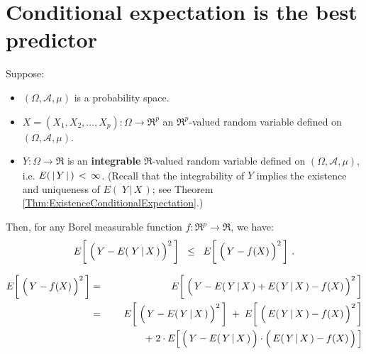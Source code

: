 

\section{Conditional expectation is the best predictor}
\setcounter{theorem}{0}
\setcounter{equation}{0}

\renewcommand{\theenumi}{\roman{enumi}}
\renewcommand{\labelenumi}{\textnormal{(\theenumi)}$\;\;$}


\begin{theorem}
\mbox{}
\vskip 0.2cm
\noindent
Suppose:
\begin{itemize}
\item
	$(\Omega,\mathcal{A},\mu)$ is a probability space.
\item
	$X = (X_{1}, X_{2}, \ldots, X_{p}) : \Omega \longrightarrow \Re^{p}$ an $\Re^{p}$-valued random variable
	defined on $(\Omega,\mathcal{A},\mu)$.
\item
	$Y : \Omega \longrightarrow \Re$ is an \textbf{\color{red}integrable} $\Re$-valued random variable
	defined on $(\Omega,\mathcal{A},\mu)$,
	i.e. $E(\,\vert\,\overset{{\color{white}.}}{Y}\,\vert\,)\,<\,\infty$.
	\vskip 0.01cm
	(Recall that the integrability of $Y$ implies the existence and uniqueness of $E\!\left(\;Y\,\vert\,X\,\right)$;
	see Theorem \ref{Thm:ExistenceConditionalExpectation}.)
\end{itemize}
Then, for any Borel measurable function $f : \Re^{p} \longrightarrow \Re$, we have:
\begin{equation*}
E\!\left[\;\left(\,Y \overset{{\color{white}.}}{-} E(\;Y\,\vert\,X\,)\,\right)^{2}\,\right]
\;\; \leq \;\;
E\!\left[\;\left(\,Y \overset{{\color{white}.}}{-} f(X)\,\right)^{2}\,\right]\,.
\end{equation*}
\end{theorem}
\proof
\begin{eqnarray*}
E\!\left[\;\left(\,Y \overset{{\color{white}.}}{-} f(X)\,\right)^{2}\,\right]
&=&
	E\!\left[\;\left(\,Y \overset{{\color{white}.}}{-} E(\,Y\,\vert\,X\,) + E(\,Y\,\vert\,X\,) - f(X)\,\right)^{2}\,\right]
\\
&=&
	{\color{white}+}\;\;
	E\!\left[\;\left(\,Y \overset{{\color{white}.}}{-} E(\,Y\,\vert\,X\,)\,\right)^{2}\,\right]
	\;+\;
	E\!\left[\;\left(\,E(\,Y\,\vert\,X\,) \overset{{\color{white}.}}{-} f(X)\,\right)^{2}\,\right]
\\
&&
	+\;
	2 \cdot E\!\left[\,
		\left(\,Y \overset{{\color{white}.}}{-} E(\,Y\,\vert\,X\,)\,\right)
		\cdot
		\left(\,E(\,Y\,\vert\,X\,) \overset{{\color{white}.}}{-} f(X)\,\right)
		\,\right]
\end{eqnarray*}
